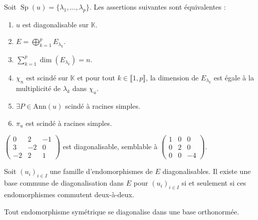   \begin{theorem}
    Soit $\operatorname{Sp}(u) = \{ \lambda_1, \dots, \lambda_p \}$. Les assertions suivantes sont équivalentes :
    \begin{enumerate}[label={\bfseries(\roman*)}]
      \item $u$ est diagonalisable sur $\mathbb{K}$.
      \item $E = \bigoplus_{k=1}^p E_{\lambda_k}$.
      \item $\sum_{k=1}^p \dim(E_{\lambda_k}) = n$.
      \item $\chi_n$ est scindé sur $\mathbb{K}$ et pour tout $k \in \llbracket 1, p \rrbracket$, la dimension de $E_{\lambda_k}$ est égale à la multiplicité de $\lambda_k$ dans $\chi_u$.
      \item $\exists P \in \mathrm{Ann}(u)$ scindé à racines simples.
      \item $\pi_u$ est scindé à racines simples.
    \end{enumerate}
  \end{theorem}


  \begin{example}
    $\begin{pmatrix} 0 & 2 & -1 \\ 3 & -2 & 0 \\ -2 & 2 & 1 \end{pmatrix}$ est diagonalisable, semblable à $\begin{pmatrix} 1 & 0 & 0 \\ 0 & 2 & 0 \\ 0 & 0 & -4 \end{pmatrix}$.
  \end{example}


  \begin{theorem}
    Soit $(u_i)_{i \in I}$ une famille d'endomorphismes de $E$ diagonalisables. Il existe une base commune de diagonalisation dans $E$ pour $(u_i)_{i \in I}$ si et seulement si ces endomorphismes commutent deux-à-deux.
  \end{theorem}


  \begin{theorem}
    Tout endomorphisme symétrique se diagonalise dans une base orthonormée.
  \end{theorem}

